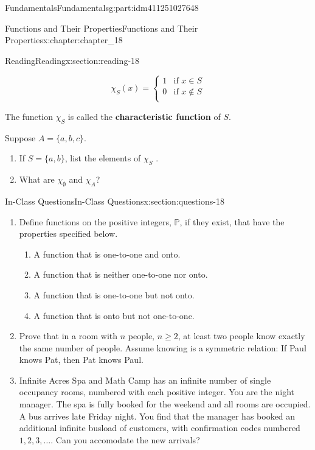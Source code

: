 \documentclass[oneside,10pt,]{book}
\newcommand{\terminology}[1]{\textbf{#1}}
\numberwithin{equation}{section}
\begin{document}
\begin{partptx}{Fundamentals}{}{Fundamentals}{}{}{g:part:idm411251027648}
\begin{chapterptx}{Functions and Their Properties}{}{Functions and Their Properties}{}{}{x:chapter:chapter_18}
\begin{sectionptx}{Reading}{}{Reading}{}{}{x:section:reading-18}
\begin{enumerate}[label=\arabic*.]
\begin{equation*}
\chi_S(x)= \left\{
\begin{array}{cc}
1 & \textrm{if } x\in S \\
0 & \textrm{if } x\notin S \\
\end{array}
\right.
\end{equation*}
%
\par
The function \(\chi_S\) is called the \terminology{characteristic function} of \(S\).%
\par
Suppose \(A = \{a, b, c\}\).%
\begin{enumerate}[label=(\alph*)]
\item{}If  \(S = \{a, b\}\), list the elements of \(\chi_S\) .%
\item{}What are \(\chi_{\emptyset}\) and \(\chi_A\)?%
\end{enumerate}
%
\end{enumerate}
%
\end{sectionptx}
%
%
\typeout{************************************************}
\typeout{************************************************}
%
\begin{sectionptx}{In-Class Questions}{}{In-Class Questions}{}{}{x:section:questions-18}
%
\begin{enumerate}[label=\arabic*.]
\item{}Define functions on the positive integers, \(\mathbb{P}\), if they exist, that have the properties specified below.%
\begin{enumerate}[label=(\alph*)]
\item{}A function that is one-to-one and onto.%
\item{}A function that is neither one-to-one nor onto.%
\item{}A function that is one-to-one but not onto.%
\item{}A function that is onto but not one-to-one.%
\end{enumerate}
%
\item{}Prove that in a room with \(n\) people, \(n \geq 2\), at least two people know exactly the same number of people. Assume knowing is a symmetric relation: If Paul knows Pat, then Pat knows Paul.%
\item{}Infinite Acres Spa and Math Camp has an infinite number of single occupancy rooms, numbered with each positive integer.  You are the night manager.  The spa is fully booked for the weekend and all rooms are occupied. A bus arrives late Friday night.  You find that the manager has booked an additional infinite busload of customers, with confirmation codes numbered \(1, 2, 3, \dots\).   Can you accomodate the new arrivals?%

\end{enumerate}
\end{sectionptx}
\end{chapterptx}
\end{partptx}
\end{document}
